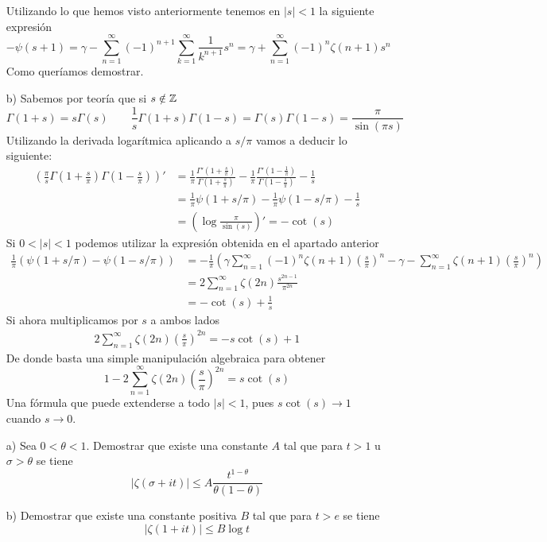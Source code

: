 \documentclass[twoside]{article}
\begin{document}
\begin{sol}
\begin{itemize}
$$$$
Utilizando lo que hemos visto anteriormente tenemos en $|s|<1$ la siguiente expresión
$$
-\psi(s+1) = \gamma -  \sum_{n=1}^\infty(-1)^{n+1}\sum_{k=1}^\infty\frac{1}{k^{n+1}}  s^n = \gamma + \sum_{n=1}^\infty(-1)^{n}\zeta(n+1) s^n
$$
Como queríamos demostrar.
\newpage
\item[b)] Sabemos por teoría que si $s\notin \mathbb{Z}$
$$\Gamma(1+s)=s\Gamma(s)  \qquad \frac{1}{s}\Gamma(1+s)\Gamma(1-s)= 	\Gamma(s)\Gamma(1-s)=\frac{\pi}{\sin(\pi s)} \qquad 
$$
Utilizando la derivada logarítmica aplicando a $s/\pi$ vamos a deducir lo siguiente:
\begin{align*}
\left(\frac{\pi}{s}\Gamma\left(1+\frac{s}{\pi}\right)\Gamma\left(1-\frac{s}{\pi}\right)\right)' & = \frac{1}{\pi}\frac{\Gamma'\left(1+\frac{s}{\pi}\right)}{\Gamma\left(1+\frac{s}{\pi}\right)} - \frac{1}{\pi}\frac{\Gamma'(1-\frac{1}{\pi})}{\Gamma(1-\frac{1}{\pi})} - \frac{1}{s}\\
 &= \frac{1}{\pi}\psi(1+s/\pi)-\frac{1}{\pi}\psi(1-s/\pi) - \frac{1}{s}\\
&=\left(\log\frac{\pi}{\sin(s)}\right)'  = -\cot(s)
\end{align*}
Si $0<|s|<1$ podemos utilizar la expresión obtenida en el apartado anterior
\begin{align*}
\frac{1}{\pi}\left(\psi(1+s/\pi)-\psi(1-s/\pi)\right) &=  -\frac{1}{\pi}\left(\gamma \sum_{n=1}^\infty(-1)^{n}\zeta(n+1) \left(\frac{s}{\pi}\right)^n -  \gamma - \sum_{n=1}^\infty\zeta(n+1) \left(\frac{s}{\pi}\right)^n\right)\\
&=2\sum_{n=1}^\infty \zeta(2n)\frac{s^{2n-1}}{\pi^{2n}}\\
&=-\cot(s)+\frac{1}{s}
\end{align*}
Si ahora multiplicamos por $s$ a ambos lados
\begin{gather*}
2\sum_{n=1}^\infty \zeta(2n)\left(\frac{s}{\pi}\right)^{2n}=-s\cot(s)+1 
\end{gather*}
De donde basta una simple manipulación algebraica para obtener
$$
1-2\sum_{n=1}^\infty \zeta(2n)\left(\frac{s}{\pi}\right)^{2n}=s\cot(s)
$$
Una fórmula que puede extenderse a todo $|s|<1$, pues $s\cot(s)\to 1$ cuando $s\to 0$.
\end{itemize}
\end{sol}
\newpage

\begin{ejercicio}{7}
\begin{itemize}
\item[]
\item[a)] Sea $0<\theta<1$. Demostrar que existe una constante $A$ tal que para $t>1$ u $\sigma>\theta$ se tiene
$$
|\zeta(\sigma +it)|\leq A\frac{t^{1-\theta}}{\theta(1-\theta)}
$$
\item[b)] Demostrar que existe una constante positiva $B$ tal que para $t>e$ se tiene
$$
|\zeta(1+it)|\leq B\log t
$$
\end{itemize}
\end{ejercicio}
\end{document}
